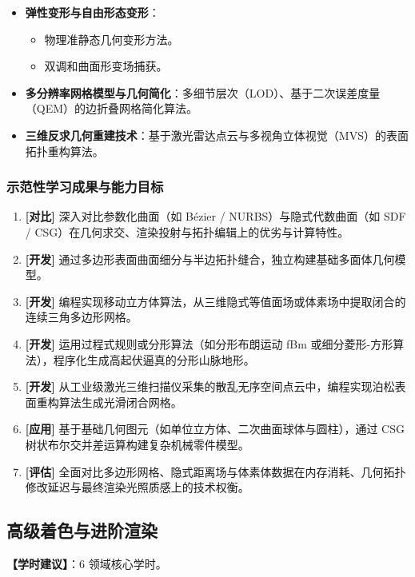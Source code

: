 \begin{itemize}
\begin{itemize}
        \item 文法驱动的生成式系统：L-系统（Lindenmayer Systems，植物分支形态生成，与编程语言形式文法交叉）。
        \item 基于深度学习的生成式几何模型（如 NeRF 神经辐射场与 3D 高斯泼溅 Gaussian Splatting 初步）。
    \end{itemize}
    \item \textbf{弹性变形与自由形态变形}：
    \begin{itemize}
        \item 物理准静态几何变形方法。
        \item 双调和曲面形变场捕获。
    \end{itemize}
    \item \textbf{多分辨率网格模型与几何简化}：多细节层次（LOD）、基于二次误差度量（QEM）的边折叠网格简化算法。
    \item \textbf{三维反求几何重建技术}：基于激光雷达点云与多视角立体视觉（MVS）的表面拓扑重构算法。
\end{itemize}

\subsubsection{示范性学习成果与能力目标}
\begin{enumerate}
    \item \textbf{[对比]} 深入对比参数化曲面（如 Bézier / NURBS）与隐式代数曲面（如 SDF / CSG）在几何求交、渲染投射与拓扑编辑上的优劣与计算特性。
    \item \textbf{[开发]} 通过多边形表面曲面细分与半边拓扑缝合，独立构建基础多面体几何模型。
    \item \textbf{[开发]} 编程实现移动立方体算法，从三维隐式等值面场或体素场中提取闭合的连续三角多边形网格。
    \item \textbf{[开发]} 运用过程式规则或分形算法（如分形布朗运动 fBm 或细分菱形-方形算法），程序化生成高起伏逼真的分形山脉地形。
    \item \textbf{[开发]} 从工业级激光三维扫描仪采集的散乱无序空间点云中，编程实现泊松表面重构算法生成光滑闭合网格。
    \item \textbf{[应用]} 基于基础几何图元（如单位立方体、二次曲面球体与圆柱），通过 CSG 树状布尔交并差运算构建复杂机械零件模型。
    \item \textbf{[评估]} 全面对比多边形网格、隐式距离场与体素体数据在内存消耗、几何拓扑修改延迟与最终渲染光照质感上的技术权衡。
\end{enumerate}

\subsection{高级着色与进阶渲染}
\textbf{【学时建议】}：6 领域核心学时。

